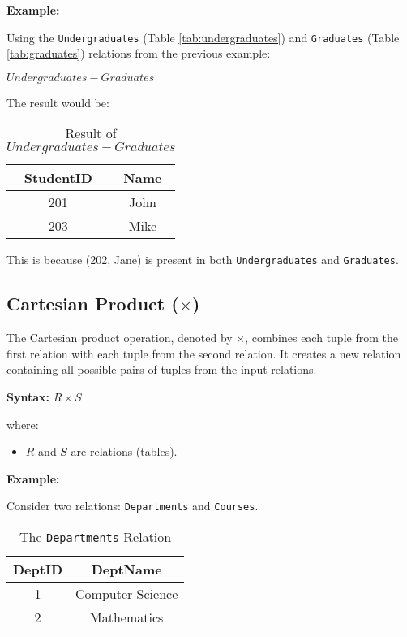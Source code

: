\documentclass[12pt]{book}
\begin{document}
\textbf{Example:}

Using the \texttt{Undergraduates} (Table \ref{tab:undergraduates}) and \texttt{Graduates} (Table \ref{tab:graduates}) relations from the previous example:

$\mathit{Undergraduates} - \mathit{Graduates}$

The result would be:

\begin{table}[htbp]
\centering
\begin{tabular}{@{}cc@{}}
\toprule
StudentID & Name \\
\midrule
201 & John \\
203 & Mike \\
\bottomrule
\end{tabular}
\caption{Result of $\mathit{Undergraduates} - \mathit{Graduates}$}
\label{tab:set_difference_result}
\end{table}

This is because (202, Jane) is present in both \texttt{Undergraduates} and \texttt{Graduates}.

\subsection{Cartesian Product ($\times$)}

The Cartesian product operation, denoted by $\times$, combines each tuple from the first relation with each tuple from the second relation. It creates a new relation containing all possible pairs of tuples from the input relations.

\textbf{Syntax:} $\mathit{R} \times \mathit{S}$

where:
\begin{itemize}
    \item $\mathit{R}$ and $\mathit{S}$ are relations (tables).
\end{itemize}

\textbf{Example:}

Consider two relations: \texttt{Departments} and \texttt{Courses}.

\begin{table}[htbp]
\centering
\begin{tabular}{@{}cc@{}}
\toprule
DeptID & DeptName \\
\midrule
1 & Computer Science \\
2 & Mathematics \\
\bottomrule
\end{tabular}
\caption{The \texttt{Departments} Relation}
\label{tab:departments_cartesian}
\end{table}
\end{document}
